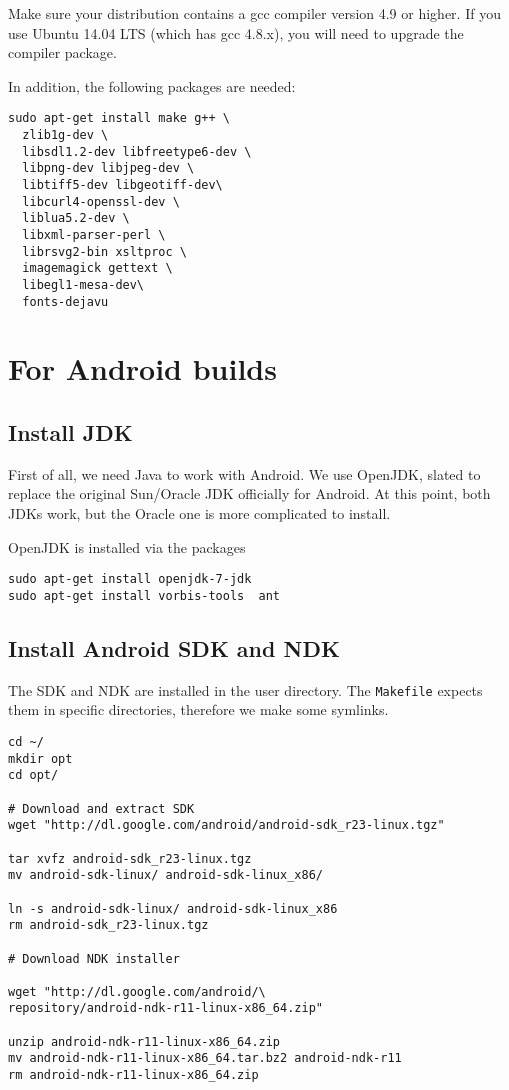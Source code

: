 Make sure your distribution contains a gcc compiler version 4.9 or higher. If you use Ubuntu 14.04 LTS (which has gcc 4.8.x), you will need to upgrade the compiler package.

In addition, the following packages are needed:

\begin{verbatim}
sudo apt-get install make g++ \
  zlib1g-dev \
  libsdl1.2-dev libfreetype6-dev \
  libpng-dev libjpeg-dev \
  libtiff5-dev libgeotiff-dev\
  libcurl4-openssl-dev \
  liblua5.2-dev \
  libxml-parser-perl \
  librsvg2-bin xsltproc \
  imagemagick gettext \
  libegl1-mesa-dev\
  fonts-dejavu
\end{verbatim}

\section{For Android  builds}
\subsection{Install JDK}
First of all, we need Java to work with Android. We use OpenJDK, slated to replace the original Sun/Oracle JDK officially for Android. At this point, both JDKs work, but the Oracle one is more complicated to install.

OpenJDK is installed via the packages
\begin{verbatim}
sudo apt-get install openjdk-7-jdk
sudo apt-get install vorbis-tools  ant
\end{verbatim}

\subsection{Install Android SDK and NDK}

The SDK and NDK are installed in the user directory. The \texttt{Makefile} expects them in specific directories, therefore we make some symlinks.

\begin{verbatim}
cd ~/
mkdir opt
cd opt/

# Download and extract SDK
wget "http://dl.google.com/android/android-sdk_r23-linux.tgz"

tar xvfz android-sdk_r23-linux.tgz
mv android-sdk-linux/ android-sdk-linux_x86/

ln -s android-sdk-linux/ android-sdk-linux_x86
rm android-sdk_r23-linux.tgz

# Download NDK installer

wget "http://dl.google.com/android/\
repository/android-ndk-r11-linux-x86_64.zip"

unzip android-ndk-r11-linux-x86_64.zip
mv android-ndk-r11-linux-x86_64.tar.bz2 android-ndk-r11
rm android-ndk-r11-linux-x86_64.zip
\end{verbatim}

